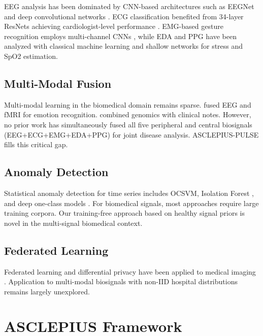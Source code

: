 \documentclass[journal]{IEEEtran}
\begin{document}
EEG analysis has been dominated by CNN-based architectures such as EEGNet
\cite{lawhern2018eegnet} and deep convolutional networks \cite{schirrmeister2017deep}.
ECG classification benefited from 34-layer ResNets achieving cardiologist-level
performance \cite{hannun2019cardiologist}. EMG-based gesture recognition employs
multi-channel CNNs \cite{côté2019deep}, while EDA and PPG have been analyzed
with classical machine learning and shallow networks for stress and SpO2
estimation.

\subsection{Multi-Modal Fusion}

Multi-modal learning in the biomedical domain remains sparse.
\cite{zhang2020multimodal} fused EEG and fMRI for emotion recognition.
\cite{steyaert2023multimodal} combined genomics with clinical notes.
However, no prior work has simultaneously fused all five peripheral and
central biosignals (EEG+ECG+EMG+EDA+PPG) for joint disease analysis.
ASCLEPIUS-PULSE fills this critical gap.

\subsection{Anomaly Detection}

Statistical anomaly detection for time series includes OCSVM, Isolation
Forest \cite{liu2008isolation}, and deep one-class models \cite{ruff2018deep}.
For biomedical signals, most approaches require large training corpora. Our
training-free approach based on healthy signal priors is novel in the
multi-signal biomedical context.

\subsection{Federated Learning}

Federated learning \cite{mcmahan2017communication} and differential privacy
\cite{dwork2014algorithmic} have been applied to medical imaging
\cite{rieke2020future}. Application to multi-modal biosignals with
non-IID hospital distributions remains largely unexplored.

\section{ASCLEPIUS Framework}
\label{sec:framework}
\end{document}
